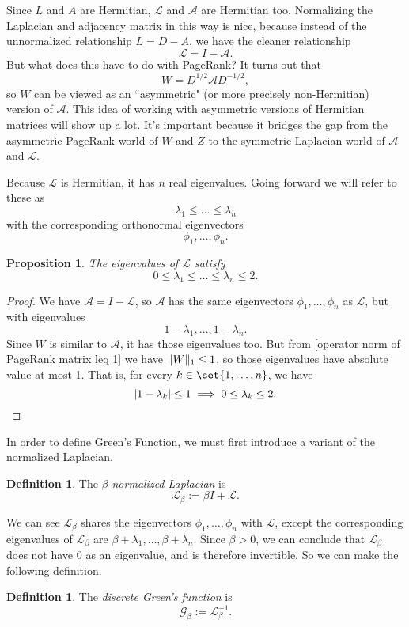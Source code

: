 \documentclass[12pt]{article}
\newtheorem{prop}[thm]{Proposition}
\theoremstyle{definition}
\newtheorem{defn}[thm]{Definition}
\DeclarePairedDelimiter\abs{\lvert}{\rvert}
\DeclarePairedDelimiter\norm{\lVert}{\rVert}
\newcommand{\lap}{\mathcal{L}}
\newcommand{\normadj}{\mathcal{A}}
\newcommand{\green}{\mathcal{G}}
\begin{document}
Since $L$ and $A$ are Hermitian, $\lap$ and $\normadj$ are Hermitian too. Normalizing the Laplacian and adjacency matrix in this way is nice, because instead of the unnormalized relationship $L = D - A$, we have the cleaner relationship $$\lap = I - \normadj.$$
But what does this have to do with PageRank? It turns out that $$W = D^{1/2} \normadj D^{-1/2},$$ so $W$ can be viewed as an ``asymmetric" (or more precisely non-Hermitian) version of $\normadj$. This idea of working with asymmetric versions of Hermitian matrices will show up a lot. It's important because it bridges the gap from the asymmetric PageRank world of $W$ and $Z$ to the symmetric Laplacian world of $\normadj$ and $\lap$.

Because $\lap$ is Hermitian, it has $n$ real eigenvalues. Going forward we will refer to these as $$\lambda_1 \leq \dots \leq \lambda_n$$ with the corresponding orthonormal eigenvectors $$\phi_1, \dots, \phi_n.$$

\begin{prop}
The eigenvalues of $\lap$ satisfy $$0 \leq \lambda_1 \leq \dots \leq \lambda_n \leq 2.$$
\end{prop}
\begin{proof}
We have $\normadj = I - \lap$, so $\normadj$ has the same eigenvectors $\phi_1, \dots, \phi_n$ as $\lap$, but with eigenvalues $$1 - \lambda_1, \dots, 1 - \lambda_n.$$ Since $W$ is similar to $\normadj$, it has those eigenvalues too. But from \cref{operator norm of PageRank matrix leq 1} we have $\norm{W}_1 \leq 1$, so those eigenvalues have absolute value at most 1. That is, for every $k \in \set{1, \dots, n}$, we have
$$
\abs*{1 - \lambda_k} \leq 1 \implies 0 \leq \lambda_k \leq 2.
$$
\end{proof}

In order to define Green's Function, we must first introduce a variant of the normalized Laplacian.

\begin{defn}
The \textit{$\beta$-normalized Laplacian} is $$\lap_\beta := \beta I + \lap.$$
\end{defn}

We can see $\lap_\beta$ shares the eigenvectors $\phi_1, \dots, \phi_n$ with $\lap$, except the corresponding eigenvalues of $\lap_\beta$ are $\beta + \lambda_1, \dots, \beta + \lambda_n$. Since $\beta > 0$, we can conclude that $\lap_\beta$ does not have 0 as an eigenvalue, and is therefore invertible. So we can make the following definition.

\begin{defn}
The \textit{discrete Green's function} is $$\green_\beta := \lap_\beta^{-1}.$$
\end{defn}
\end{document}
